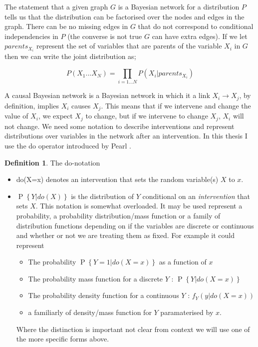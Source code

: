 \documentclass[11pt,a4paper,oneside]{book}
\renewcommand{\P}[1]{\operatorname{P}\left\{#1\right\}}
\theoremstyle{plain}
\theoremstyle{definition}
\newtheorem{definition}[theorem]{Definition}
\begin{document}
The statement that a given graph $G$ is a Bayesian network for a distribution $P$ tells us that the distribution can be factorised over the nodes and edges in the graph. There can be no missing edges in $G$ that do not correspond to conditional independencies in $P$ (the converse is not true $G$ can have extra edges). If we let $parents_{X_{i}}$ represent the set of variables that are parents of the variable $X_{i}$ in $G$ then we can write the joint distribution as; 

\begin{equation}
P(X_{1}...X_{N}) = \prod_{i = 1...N}P(X_{i}|parents_{X_{i}})
\end{equation}

A causal Bayesian network is a Bayesian network in which it a link $X_{i} \rightarrow X_{j}$, by definition, implies $X_{i}$ causes $X_{j}$. This means that if we intervene and change the value of $X_{i}$, we expect $X_{j}$ to change, but if we intervene to change $X_{j}$, $X_{i}$ will not change. We need some notation to describe interventions and represent distributions over variables in the network after an intervention. In this thesis I use the do operator introduced by Pearl \citep{Pearl2000}.


\begin{definition}{The do-notation}
\begin{itemize}
\item do(X=x) denotes an intervention that sets the random variable(s) $X$ to $x$.
\item $\P{Y|do(X)}$ is the distribution of $Y$ conditional on an \emph{intervention} that sets $X$. This notation is somewhat overloaded. It may be used represent a probability, a probability distribution/mass function or a family of distribution functions depending on if the variables are discrete or continuous and whether or not we are treating them as fixed. For example it could represent 
\begin{itemize}
\item The probability $\P{Y=1|do(X=x)}$ as a function of $x$
\item The probability mass function for a discrete $Y$ : $\P{Y|do(X=x)}$
\item The probability density function for a continuous  $Y$ : $f_Y(y|do(X=x))$
\item a familiarly of density/mass function for $Y$ paramaterised by $x$.
\end{itemize}
Where the distinction is important not clear from context we will use one of the more specific forms above. 
\end{itemize}
\end{definition}
\end{document}
